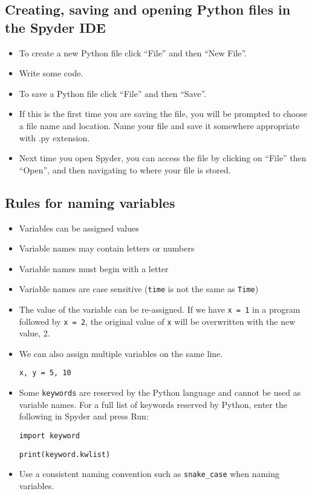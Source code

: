\documentclass[12pt]{article}
\begin{document}
\subsection*{Creating, saving and opening Python files in the Spyder IDE}
     
\begin{itemize}
    \item To create a new Python file click ``File'' and then ``New File''.
    \item Write some code.
    \item To save a Python file click ``File'' and then ``Save''.
    \item If this is the first time you are saving the file, you will be prompted to choose a file name and location. Name your file and save it somewhere appropriate with .py extension. 
    \item Next time you open Spyder, you can access the file by clicking on ``File'' then ``Open'', and then navigating to where your file is stored.
\end{itemize}
    

\subsection*{Rules for naming variables}
	\begin{itemize}
        \item Variables can be assigned values
        \item Variable names may contain letters or numbers
        \item Variable names must begin with a letter
        \item Variable names are case sensitive ({\tt time} is not the same as {\tt Time})
        \item The value of the variable can be re-assigned. If we have {\tt x = 1} in a program followed by {\tt x = 2}, the original value of {\tt x} will be overwritten with the new value, 2. 
        \item We can also assign multiple variables on the same line.
	
	    \vspace{0.5em}
		{\tt x, y  = 5, 10}
		\vspace{0.5em}
		
        \item Some {\tt keywords} are reserved by the Python language and cannot be used as variable names. For a full list of keywords reserved by Python, enter the following in Spyder and press Run:
		
		\vspace{0.5em}
		{\tt import keyword}
		
		{\tt print(keyword.kwlist)}
		\vspace{0.5em}
		
		\item{Use a consistent naming convention such as {\tt snake\_case} when naming variables.}
		
    \end{itemize}
    
\end{document}
